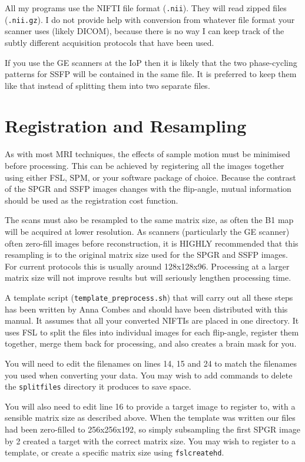 \documentclass{report}
\begin{document}
All my programs use the NIFTI file format (\texttt{.nii}). They will read zipped files (\texttt{.nii.gz}). I do not provide help with conversion from whatever file format your scanner uses (likely DICOM), because there is no way I can keep track of the subtly different acquisition protocols that have been used.

If you use the GE scanners at the IoP then it is likely that the two phase-cycling patterns for SSFP will be contained in the same file. It is preferred to keep them like that instead of splitting them into two separate files.

\section{Registration and Resampling}

As with most MRI techniques, the effects of sample motion must be minimised before processing. This can be achieved by registering all the images together using either FSL, SPM, or your software package of choice. Because the contrast of the SPGR and SSFP images changes with the flip-angle, mutual information should be used as the registration cost function.

The scans must also be resampled to the same matrix size, as often the B1 map will be acquired at lower resolution. As scanners (particularly the GE scanner) often zero-fill images before reconstruction, it is HIGHLY recommended that this resampling is to the original matrix size used for the SPGR and SSFP images. For current protocols this is usually around 128x128x96. Processing at a larger matrix size will not improve results but will seriously lengthen processing time.

A template script (\texttt{template\_preprocess.sh}) that will carry out all these steps has been written by Anna Combes and should have been distributed with this manual. It assumes that all your converted NIFTIs are placed in one directory. It uses FSL to split the files into individual images for each flip-angle, register them together, merge them back for processing, and also creates a brain mask for you.

You will need to edit the filenames on lines 14, 15 and 24 to match the filenames you used when converting your data. You may wish to add commands to delete the \texttt{splitfiles} directory it produces to save space.

You will also need to edit line 16 to provide a target image to register to, with  a sensible matrix size as described above. When the template was written our files had been zero-filled to 256x256x192, so simply subsampling the first SPGR image by 2 created a target with the correct matrix size. You may wish to register to a template, or create a specific matrix size using \texttt{fslcreatehd}.
\end{document}
